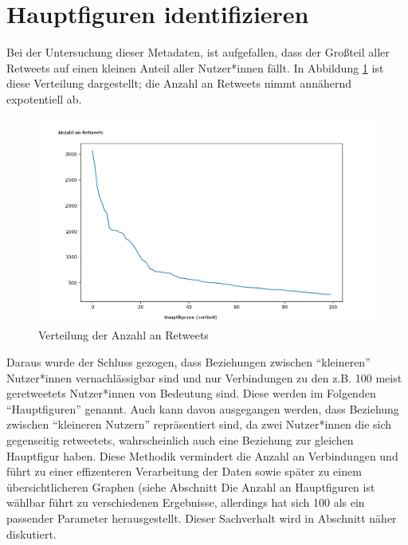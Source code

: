 \section{Hauptfiguren identifizieren}
Bei der Untersuchung dieser Metadaten, ist aufgefallen, dass der Großteil aller \glspl{Retweet} auf einen kleinen Anteil aller Nutzer*innen fällt.
In Abbildung \ref{fig:tweetverteilung} ist diese Verteilung dargestellt; die Anzahl an \glspl{Retweet} nimmt annähernd expotentiell ab. 
\begin{figure}[h!]
	\centering
	\includegraphics[width=0.8\linewidth]{images/Tweet_verteilung}
	\caption[]{Verteilung der Anzahl an \glspl{Retweet}}
	\label{fig:tweetverteilung}
\end{figure}
Daraus wurde der Schluss gezogen, dass Beziehungen zwischen "`kleineren"' Nutzer*innen vernachlässigbar sind und nur Verbindungen zu den z.B. 100 meist \glspl{geretweetet} Nutzer*innen von Bedeutung sind. Diese werden im Folgenden "`Hauptfiguren"' genannt. Auch kann davon ausgegangen werden, dass Beziehung zwischen "`kleineren Nutzern"'  repräsentiert sind, da zwei Nutzer*innen die sich gegenseitig \glspl{retweetet}, wahrscheinlich auch eine Beziehung zur gleichen Hauptfigur haben. 
Diese Methodik vermindert die Anzahl an Verbindungen und führt zu einer effizenteren Verarbeitung der Daten sowie später zu einem übersichtlicheren Graphen (siehe Abschnitt %
Die Anzahl an Hauptfiguren ist wählbar führt zu verschiedenen Ergebnisse, allerdings hat sich 100 als ein passender Parameter herausgestellt. Dieser Sachverhalt wird in Abschnitt näher diskutiert.

